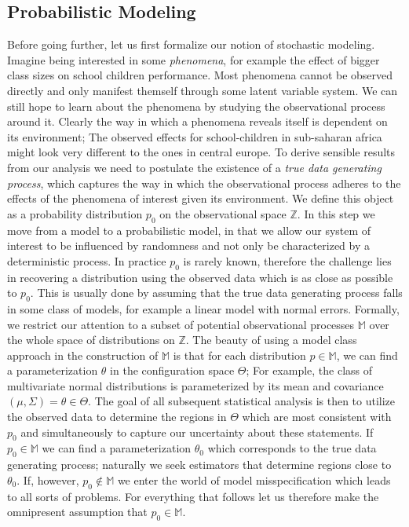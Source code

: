 \subsection{Probabilistic Modeling}
Before going further, let us first formalize our notion of stochastic modeling.
Imagine being interested in some \textit{phenomena}, for example the effect of bigger class sizes on school children performance.
Most phenomena cannot be observed directly and only manifest themself through some latent variable system.
We can still hope to learn about the phenomena by studying the observational process around it.
Clearly the way in which a phenomena reveals itself is dependent on its environment;
The observed effects for school-children in sub-saharan africa might look very different to the ones in central europe.
To derive sensible results from our analysis we need to postulate the existence of a \textit{true data generating process}, which captures the way in which the observational process adheres to the effects of the phenomena of interest given its environment.
We define this object as a probability distribution $p_0$ on the observational space $\mathbb{Z}$.
In this step we move from a model to a probabilistic model, in that we allow our system of interest to be influenced by randomness and not only be characterized by a deterministic process.
In practice $p_0$ is rarely known, therefore the challenge lies in recovering a distribution using the observed data which is as close as possible to $p_0$.
This is usually done by assuming that the true data generating process falls in some class of models, for example a linear model with normal errors.
Formally, we restrict our attention to a subset of potential observational processes $\mathbb{M}$ over the whole space of distributions on $\mathbb{Z}$.
The beauty of using a model class approach in the construction of $\mathbb{M}$ is that for each distribution $p \in \mathbb{M}$, we can find a parameterization $\theta$ in the configuration space $\Theta$; For example, the class of multivariate normal distributions is parameterized by its mean and covariance $(\mu, \Sigma) = \theta \in \Theta$.
The goal of all subsequent statistical analysis is then to utilize the observed data to determine the regions in $\Theta$ which are most consistent with $p_0$ and simultaneously to capture our uncertainty about these statements.
If $p_0 \in \mathbb{M}$ we can find a parameterization $\theta_0$ which corresponds to the true data generating process; naturally we seek estimators that determine regions close to $\theta_0$. If, however, $p_0 \not\in \mathbb{M}$ we enter the world of model misspecification which leads to all sorts of problems.
For everything that follows let us therefore make the omnipresent assumption that $p_0 \in \mathbb{M}$.

